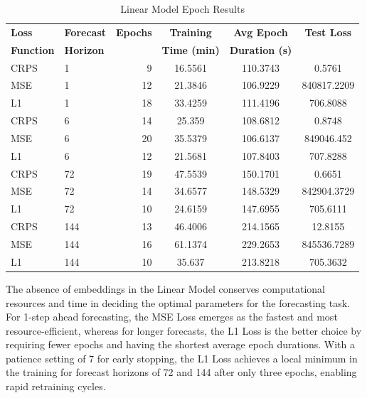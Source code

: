 \documentclass{article}
\begin{document}

\begin{table}
    \footnotesize
    \centering
    \caption{Linear Model Epoch Results}
    \begin{tabular}{l|l|r|S|S|S}
        \toprule
        \textbf{Loss} & \textbf{Forecast} & \textbf{Epochs} & \textbf{Training} & \textbf{Avg Epoch} & \textbf{Test Loss} \\
        \textbf{Function} & \textbf{Horizon} & & \textbf{Time (min)} & \textbf{Duration (s)} & \\
        \midrule
        CRPS & 1 & 9 & 16.5561 & 110.3743 & 0.5761 \\
        MSE & 1 & 12 & 21.3846 & 106.9229 & 840817.2209 \\
        L1 & 1 & 18 & 33.4259 & 111.4196 & 706.8088 \\
        \midrule
        CRPS & 6 & 14 & 25.359 & 108.6812 & 0.8748 \\
        MSE & 6 & 20 & 35.5379 & 106.6137 & 849046.452 \\
        L1 & 6 & 12 & 21.5681 & 107.8403 & 707.8288 \\
        \midrule
        CRPS & 72 & 19 & 47.5539 & 150.1701 & 0.6651 \\
        MSE & 72 & 14 & 34.6577 & 148.5329 & 842904.3729 \\
        L1 & 72 & 10 & 24.6159 & 147.6955 & 705.6111 \\
        \midrule
        CRPS & 144 & 13 & 46.4006 & 214.1565 & 12.8155 \\
        MSE & 144 & 16 & 61.1374 & 229.2653 & 845536.7289 \\
        L1 & 144 & 10 & 35.637 & 213.8218 & 705.3632 \\
    \bottomrule
    \end{tabular}
    \label{tab:linear_epoch}
\end{table}

The absence of embeddings in the Linear Model conserves computational resources and time in deciding the optimal parameters for the forecasting task. For 1-step ahead forecasting, the MSE Loss emerges as the fastest and most resource-efficient, whereas for longer forecasts, the L1 Loss is the better choice by requiring fewer epochs and having the shortest average epoch durations. With a patience setting of 7 for early stopping, the L1 Loss achieves a local minimum in the training for forecast horizons of 72 and 144 after only three epochs, enabling rapid retraining cycles.
\end{document}

